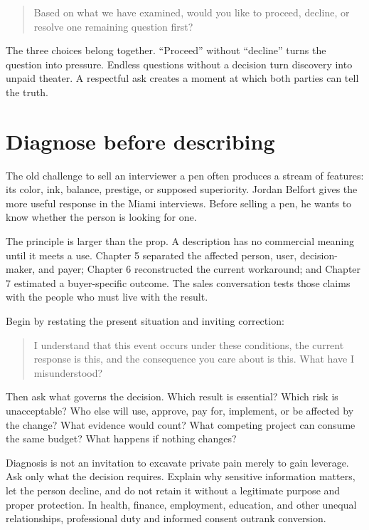 \begin{quote}
Based on what we have examined, would you like to proceed, decline, or resolve
one remaining question first?
\end{quote}

The three choices belong together. ``Proceed'' without ``decline'' turns the
question into pressure. Endless questions without a decision turn discovery
into unpaid theater. A respectful ask creates a moment at which both parties
can tell the truth.

\section{Diagnose before describing}

The old challenge to sell an interviewer a pen often produces a stream of
features: its color, ink, balance, prestige, or supposed superiority. Jordan
Belfort gives the more useful response in the Miami interviews. Before selling
a pen, he wants to know whether the person is looking for one.

The principle is larger than the prop. A description has no commercial meaning
until it meets a use. Chapter 5 separated the affected person, user,
decision-maker, and payer; Chapter 6 reconstructed the current workaround; and
Chapter 7 estimated a buyer-specific outcome. The sales conversation tests
those claims with the people who must live with the result.

Begin by restating the present situation and inviting correction:

\begin{quote}
I understand that this event occurs under these conditions, the current
response is this, and the consequence you care about is this. What have I
misunderstood?
\end{quote}

Then ask what governs the decision. Which result is essential? Which risk is
unacceptable? Who else will use, approve, pay for, implement, or be affected by
the change? What evidence would count? What competing project can consume the
same budget? What happens if nothing changes?

Diagnosis is not an invitation to excavate private pain merely to gain
leverage. Ask only what the decision requires. Explain why sensitive
information matters, let the person decline, and do not retain it without a
legitimate purpose and proper protection. In health, finance, employment,
education, and other unequal relationships, professional duty and informed
consent outrank conversion.

